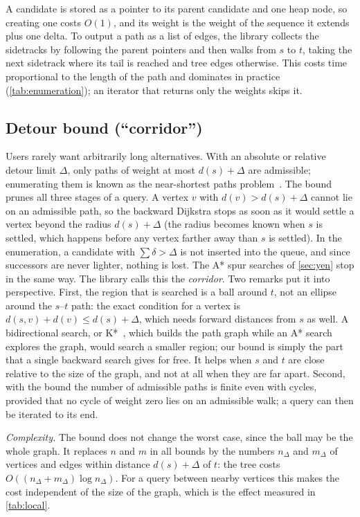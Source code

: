 \documentclass[11pt,a4paper]{article}
\begin{document}
A candidate is stored as a pointer to its parent candidate and one heap node, so creating one costs $O(1)$, and its
weight is the weight of the sequence it extends plus one delta. To output a path as a list
of edges, the library collects the sidetracks by following the parent pointers and then walks from $s$ to $t$,
taking the next sidetrack where its tail is reached and tree edges otherwise. This costs time proportional to the
length of the path and dominates in practice (\cref{tab:enumeration}); an iterator that returns only the weights
skips it.

\subsection{Detour bound (``corridor'')}\label{sec:corridor}
Users rarely want arbitrarily long alternatives. With an absolute or relative detour limit $\Delta$, only paths of
weight at most $d(s)+\Delta$ are admissible; enumerating them is known as the near-shortest paths
problem~\cite{byers1984,carlyle2005}. The bound prunes all three stages of a query. A vertex $v$ with
$d(v)>d(s)+\Delta$ cannot lie on an admissible path, so the backward Dijkstra stops as soon as it would settle a
vertex beyond the radius $d(s)+\Delta$ (the radius becomes known when $s$ is settled, which happens before any
vertex farther away than $s$ is settled). In the enumeration, a candidate with $\sum\delta>\Delta$ is not inserted
into the queue, and since successors are never lighter, nothing is lost. The A* spur searches of
\cref{sec:yen} stop in the same way. The library calls this the \emph{corridor}. Two remarks put it into
perspective. First, the region that is searched is a ball around $t$, not an ellipse around the $s$--$t$
path: the exact condition for a vertex is $d(s,v)+d(v)\le d(s)+\Delta$, which needs forward distances from $s$ as
well. A bidirectional search, or K*~\cite{aljazzar2011}, which builds the path graph while an A* search explores the
graph, would search a smaller region; our bound is simply the part that a single backward search gives for free. It
helps when $s$ and $t$ are close relative to the size of the graph, and not at all when they are far apart. Second,
with the bound the number of admissible paths is finite even with cycles, provided that no cycle of weight zero
lies on an admissible walk; a query can then be iterated to its end.

\emph{Complexity.} The bound does not change the worst case, since the ball may be the whole graph. It replaces
$n$ and $m$ in all bounds by the numbers $n_\Delta$ and $m_\Delta$ of vertices and edges within distance
$d(s)+\Delta$ of $t$: the tree costs $O((n_\Delta+m_\Delta)\log n_\Delta)$. For a query between nearby vertices this
makes the cost independent of the size of the graph, which is the effect measured in \cref{tab:local}.
\end{document}
